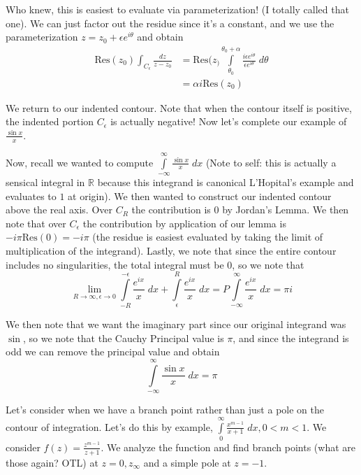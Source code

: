 \documentclass[10pt]{report}
\newcommand{\Res}[0]{\mathrm{Res} }
\begin{document}
Who knew, this is easiest to evaluate via parameterization! (I totally called that one). We can just factor out the residue since it's a constant, and we use the parameterization $z = z_0 + \epsilon e^{i\theta}$ and obtain
\begin{align*}
    \Res(z_0)\int_{C_\epsilon}\frac{dz}{z-z_0} &= \Res (z_) \displaystyle\int\limits_{\theta_0}^{\theta_0 + \alpha}\frac{i\epsilon e^{i\theta}}{\epsilon e^{i\theta}}\;d\theta\\
    &= \alpha i\Res (z_0)
\end{align*}

We return to our indented contour. Note that when the contour itself is positive, the indented portion $C_\epsilon$ is actually negative! Now let's complete our example of $\frac{\sin x}{x}$.

Now, recall we wanted to compute $\displaystyle\int\limits_{-\infty}^{\infty}\frac{\sin x}{x}\;dx$ (Note to self: this is actually a sensical integral in $\mathbb{R}$ because this integrand is canonical L'Hopital's example and evaluates to $1$ at origin). We then wanted to construct our indented contour above the real axis. Over $C_R$ the contribution is $0$ by Jordan's Lemma. We then note that over $C_\epsilon$ the contribution by application of our lemma is $-i\pi \Res(0) = -i\pi$ (the residue is easiest evaluated by taking the limit of multiplication of the integrand). Lastly, we note that since the entire contour includes no singularities, the total integral must be $0$, so we note that
$$\lim_{R\to \infty, \epsilon \to 0}\displaystyle\int\limits_{-R}^{-\epsilon}\frac{e^{ix}}{x}\;dx + \displaystyle\int\limits_{\epsilon}^{R}\frac{e^{ix}}{x}\;dx = P\displaystyle\int\limits_{-\infty}^{\infty}\frac{e^{ix}}{x}\;dx= \pi i$$

We then note that we want the imaginary part since our original integrand was $\sin$, so we note that the Cauchy Principal value is $\pi$, and since the integrand is odd we can remove the principal value and obtain
$$\displaystyle\int\limits_{-\infty}^{\infty}\frac{\sin x}{x}\;dx = \pi$$

Let's consider when we have a branch point rather than just a pole on the contour of integration. Let's do this by example, $\displaystyle\int\limits_{0}^{\infty}\frac{x^{m-1}}{x+1}\;dx, 0 < m < 1$. We consider $f(z) = \frac{z^{m-1}}{z+1}$. We analyze the function and find branch points (what are those again? OTL) at $z=0,z_\infty$ and a simple pole at $z=-1$. 
\end{document}
